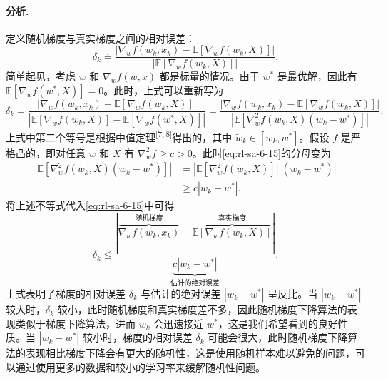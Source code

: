 \paragraph{分析.}
定义随机梯度与真实梯度之间的相对误差：
\begin{equation}
\delta_k \doteq \frac{| \nabla_w f(w_k, x_k) - \mathbb{E}[\nabla_w f(w_k, X)] |}{| \mathbb{E}[\nabla_w f(w_k, X)] |}.
\end{equation}
简单起见，考虑 $w$ 和 $\nabla_w f(w, x)$ 都是标量的情况。由于 $w^*$ 是最优解，因此有 $\mathbb{E}[\nabla_w f(w^*, X)] = 0$。此时，上式可以重新写为
\begin{equation}
\delta_k = \frac{| \nabla_w f(w_k, x_k) - \mathbb{E}[\nabla_w f(w_k, X)] |}{| \mathbb{E}[\nabla_w f(w_k, X)] - \mathbb{E}[\nabla_w f(w^*, X)] |} = \frac{| \nabla_w f(w_k, x_k) - \mathbb{E}[\nabla_w f(w_k, X)] |}{| \mathbb{E}[\nabla_w^2 f(\tilde{w}_k, X) (w_k - w^*)] |}.
\label{eq:rl-sa-6-15}
\end{equation}
上式中第二个等号是根据中值定理\textsuperscript{[7,\,8]}得出的，其中 $\tilde{w}_k \in [w_k, w^*]$。假设 $f$ 是严格凸的，即对任意 $w$ 和 $X$ 有 $\nabla_w^2 f \geqslant c > 0$。此时\eqref{eq:rl-sa-6-15}的分母变为
\begin{equation}
\begin{aligned}
\left| \mathbb{E}[\nabla_w^2 f(\tilde{w}_k, X) (w_k - w^*)] \right| &= \left| \mathbb{E}[\nabla_w^2 f(\tilde{w}_k, X)] \right| \left| (w_k - w^*) \right| \\
&\geqslant c | w_k - w^* |.
\end{aligned}
\end{equation}
将上述不等式代入\eqref{eq:rl-sa-6-15}中可得
\begin{equation}
\delta_k \leqslant \frac{\left| \overbrace{\nabla_w f(w_k, x_k)}^{\text{随机梯度}} - \overbrace{\mathbb{E}[\nabla_w f(w_k, X)]}^{\text{真实梯度}} \right|}{\underbrace{c | w_k - w^* |}_{\text{估计的绝对误差}}}.
\end{equation}
上式表明了梯度的相对误差 $\delta_k$ 与估计的绝对误差 $|w_k - w^*|$ 呈反比。当 $|w_k - w^*|$ 较大时，$\delta_k$ 较小，此时随机梯度和真实梯度差不多，因此随机梯度下降算法的表现类似于梯度下降算法，进而 $w_k$ 会迅速接近 $w^*$，这是我们希望看到的良好性质。当 $|w_k - w^*|$ 较小时，梯度的相对误差 $\delta_k$ 可能会很大，此时随机梯度下降算法的表现相比梯度下降会有更大的随机性，这是使用随机样本难以避免的问题，可以通过使用更多的数据和较小的学习率来缓解随机性问题。

